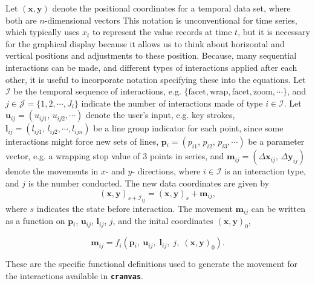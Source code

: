 \documentclass[12pt]{article}
\begin{document}
Let $(\mathbf{x},\mathbf{y})$ denote the positional coordinates
for a temporal data set, where both are $n$-dimensional vectors
This notation is unconventional for time series, which typically
uses $x_t$ to represent the value records at time $t$, but it is
necessary for the graphical display because it allows us to think
about horizontal and vertical positions and adjustments to these
position. Because, many sequential interactions can be made, and
different types of interactions applied after each other, it is
useful to incorporate notation specifying these into the equations.
Let $\mathcal{I}$ be the temporal sequence of interactions,
e.g. $\{\textrm{facet},\textrm{wrap},\textrm{facet},
\textrm{zoom},\cdots\}$, and $j\in\mathcal{J}=\{1,2,\cdots,
J_{i}\}$ indicate the number of interactions made of type $i\in
\mathcal{I}$. Let $\mathbf{u}{}_{ij}=(u_{ij1},\, u_{ij2},\cdots)$
denote the user's input, e.g. key strokes, 
$\mathbf{l}{}_{ij}=(l_{ij1},\, l_{ij2},\cdots, l_{ijn})$
be a line group indicator for each point, since some interactions might force new sets of lines, 
$\mathbf{p}{}_{i}=(p_{i1},\, p_{i2},\, p_{i3},\cdots)$
be a parameter vector, e.g. a wrapping stop value of 3 points in series, and 
$\mathbf{m}{}_{ij}=(\Delta\mathbf{x}{}_{ij},\,\Delta\mathbf{y}_{ij})$
denote the movements in $x$- and $y$- directions, where $i\in\mathcal{I}$
is an interaction type, and $j$ is the number conducted. 
The new data coordinates are given by 
\[
(\mathbf{x},\mathbf{y})_{s+\mathcal{I}_{ij}}=(\mathbf{x},\mathbf{y})_{s}+\mathbf{m}{}_{ij},
\]
where $s$ indicates the state before interaction.
The movement $\mathbf{m}{}_{ij}$ can be written as a function on $\mathbf{p}{}_{i}$,
$\mathbf{u}{}_{ij}$, $\mathbf{l}_{ij}$, $j$, and the inital
coordinates $(\mathbf{x},\mathbf{y})_0$, 

\[
\mathbf{m}{}_{ij}=f_{i}(\mathbf{p}{}_{i},\:\mathbf{u}{}_{ij},\;\mathbf{l}_{ij},\; j,\; (\mathbf{x},\mathbf{y})_{0} ).
\]

\noindent These are the specific functional definitions used to generate the movement for the interactions available in \texttt{\textbf{cranvas}}. 
\end{document}
